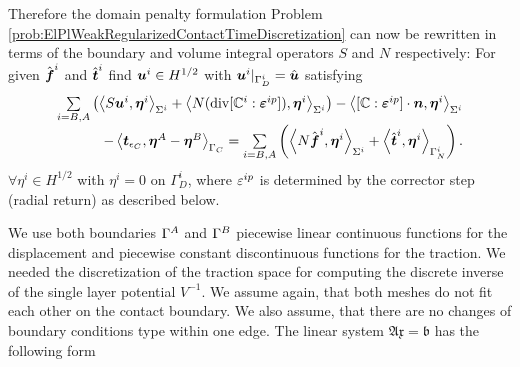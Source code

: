 \documentclass[12pt,a4paper]{scrbook}
\begin{document}
Therefore the domain penalty formulation Problem \ref{prob:ElPlWeakRegularizedContactTimeDiscretization} can now be rewritten  in terms of the boundary and volume integral operators $S$ and $N$ respectively: For given $\given{\bv{f}}^i$ and $\given{\bv{t}}^i$ find $\bv{u}^i\in H^{1/2}$ with $\bv{u}^i|_{\Gamma^i_D}=\given{\bv{u}}$ satisfying
\begin{equation} \label{eq:WeakForm_BEM}
\begin{array}{r}
\Sum_{i=\sl,\ms}\left(  
\left\langle S \bv{u}^i, \bv{\eta}^i \right\rangle_{\Sigma^i} 
+ \left\langle  N (\div[\C^i : \bv{\e}^{ip}]), \bv{\eta}^i \right\rangle_{\Sigma^i}\right)
- \left\langle [\C : \bv{\e}^{ip}] \cdot \bv{n}, \bv{\eta}^i\right\rangle_{\Sigma^i} \\[2ex]
- \left\langle \bv{t}_{\epsilon_C}, \bv{\eta}^{\ms}-\bv{\eta}^{\sl} \right\rangle_{\Gamma_C} 
= \Sum_{i=\sl,\ms}  \left(
\left\langle N \given{\bv{f}}^i, \bv{\eta}^i \right\rangle_{\Sigma^i}
+ \left\langle \given{\bv{t}}^i, \bv{\eta}^i \right\rangle_{\Gamma_N^i} \right).
\end{array}
\end{equation}
$\forall \eta^i \in H^{1/2}$ with $\eta^i=0$ on $\Gamma^i_D$, where $\e^{ip}$ is determined by the corrector step (radial return) as described below.




We use both boundaries  $\Gamma^{\ms}$ and $\Gamma^{\sl}$  piecewise linear continuous functions for the displacement and piecewise constant discontinuous functions for the traction. We needed the discretization of the traction space for computing the discrete inverse of the single layer potential $V^{-1}$. We assume again,  that both meshes do not fit each other on the contact boundary. We also assume, that there are no changes of boundary conditions type within one edge.  The linear system $\mathfrak  A \mathfrak x = {\mathfrak b}$ has the following form
\end{document}
